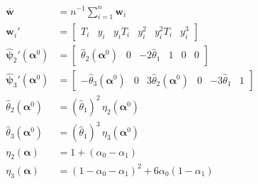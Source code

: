 \documentclass[12pt]{article}
\begin{document}
\begin{align*}
  \bar{\mathbf{w}} &= n^{-1} \sum_{i=1}^n \mathbf{w}_i \\
  \mathbf{w}_i' &= \left[
  \begin{array}{cccccc}
    T_i & y_i & y_i T_i & y_i^2 & y^2_i T_i & y_i^3
  \end{array}
\right]\\
  \widehat{\boldsymbol{\psi}}_2'(\boldsymbol{\alpha}^0) &= \left[
  \begin{array}{cccccc}
    \widehat{\theta}_2(\boldsymbol{\alpha}^0) & 0 & -2\widehat{\theta}_1 & 1 & 0 & 0
  \end{array}
\right] \\
\widehat{\boldsymbol{\psi}}_3'(\boldsymbol{\alpha}^0) &= \left[
  \begin{array}{cccccc}
    -\widehat{\theta}_3(\boldsymbol{\alpha}^0) & 0 & 3\widehat{\theta}_2(\boldsymbol{\alpha}^0) & 0 & -3\widehat{\theta}_1 & 1
  \end{array}
\right] \\
  \widehat{\theta}_2(\boldsymbol{\alpha}^0) &= (\widehat{\theta}_1)^2 \, \eta_2(\boldsymbol{\alpha}^0)\\
  \widehat{\theta}_3(\boldsymbol{\alpha}^0) &= (\widehat{\theta}_1)^3\, \eta_3(\boldsymbol{\alpha}^0)\\
  \eta_2(\boldsymbol{\alpha}) &= 1 + (\alpha_0 - \alpha_1)\\
  \eta_3(\boldsymbol{\alpha}) &= (1 - \alpha_0 - \alpha_1)^2 + 6\alpha_0(1 - \alpha_1)
\end{align*}
\end{document}
